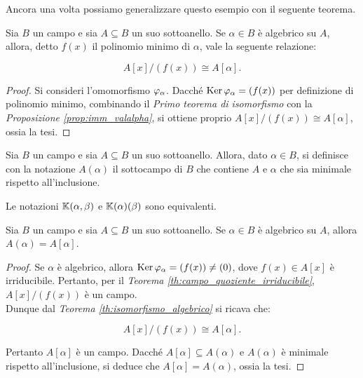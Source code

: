 Ancora una volta possiamo generalizzare questo esempio con il
seguente teorema.

\begin{theorem}
    \label{th:isomorfismo_algebrico}
    Sia $B$ un campo e sia $A \subseteq B$ un suo sottoanello.
    Se $\alpha \in B$ è algebrico su $A$, allora, detto
    $f(x)$ il polinomio minimo di $\alpha$, vale
    la seguente relazione:

    \[ A[x]/(f(x)) \cong A[\alpha]. \]

\end{theorem}

\begin{proof}
    Si consideri l'omomorfismo $\varphi_\alpha$. Dacché $\operatorname{Ker} \varphi_\alpha
        = (f(x))$ per definizione di polinomio minimo, combinando
    il \textit{Primo teorema di isomorfismo} con la
    \textit{Proposizione \ref{prop:imm_valalpha}}, si ottiene
    proprio $A[x]/(f(x)) \cong A[\alpha]$, ossia la tesi.
\end{proof}

\begin{definition}
    Sia $B$ un campo e sia $A \subseteq B$ un suo sottoanello. Allora,
    dato $\alpha \in B$,
    si definisce con la notazione $A(\alpha)$ il
    sottocampo di $B$ che contiene $A$ e $\alpha$ che
    sia minimale rispetto all'inclusione.
\end{definition}

\begin{remark*}
    Le notazioni $\mathbb{K}(\alpha, \beta)$ e $\mathbb{K}(\alpha)(\beta)$ sono equivalenti.
\end{remark*}

\begin{proposition}
    Sia $B$ un campo e sia $A \subseteq B$ un suo sottoanello.
    Se $\alpha \in B$ è algebrico su $A$, allora $A(\alpha)=A[\alpha]$.
\end{proposition}

\begin{proof}
    Se $\alpha$ è algebrico, allora $\operatorname{Ker} \varphi_\alpha = (f(x)) \neq (0)$,
    dove $f(x) \in A[x]$ è irriducibile. Pertanto, per
    il \textit{Teorema \ref{th:campo_quoziente_irriducibile}},
    $A[x]/(f(x))$ è un campo. \\

    Dunque dal \textit{Teorema \ref{th:isomorfismo_algebrico}} si
    ricava che:

    \[ A[x]/(f(x)) \cong A[\alpha]. \]

    \vskip 0.1in

    Pertanto $A[\alpha]$ è un campo. Dacché $A[\alpha] \subseteq A(\alpha)$ e $A(\alpha)$ è minimale rispetto all'inclusione,
    si deduce che $A[\alpha]=A(\alpha)$, ossia la tesi.
\end{proof}

